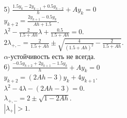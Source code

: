 \documentclass[14pt,a4paper]{extarticle}
\newcommand{\1}{\mathbbm{1}}
\begin{document}
5) $\frac{1.5 y_k-2 y_{k-1}+0.5 y_{k-2}}{h}+A y_k=0$ \\ 
$y_{k+2} = \frac{2 y_{k+1} - 0.5 y_{k}}{A h + 1.5} $.\\
$\lambda^2 - \frac{2}{1.5 + Ah} \lambda + \frac{0.5}{1.5 + Ah} = 0$.\\
$2 \lambda_{+, -} = \frac{2}{1.5 + Ah} \pm \sqrt{\frac{4}{(1.5 + Ah)^2} - \frac{2}{1.5 + Ah} }$. \\
$\alpha$-устойчивость есть не всегда. \\
6) $\frac{-0.5 y_{k+2}+2 y_{k+1}-1.5 y_k}{h}+A y_k=0$ \\ 
$y_{k+2} = (2 A h - 3) y_k + 4 y_{k+1}$.\\
$\lambda^2  - 4 \lambda - (2 A h - 3) = 0$.\\
$\lambda_{+, -} = 2 \pm \sqrt{1 - 2 A h}$.\\
$|\lambda_{+}| > 1 $. \\
\end{document}
